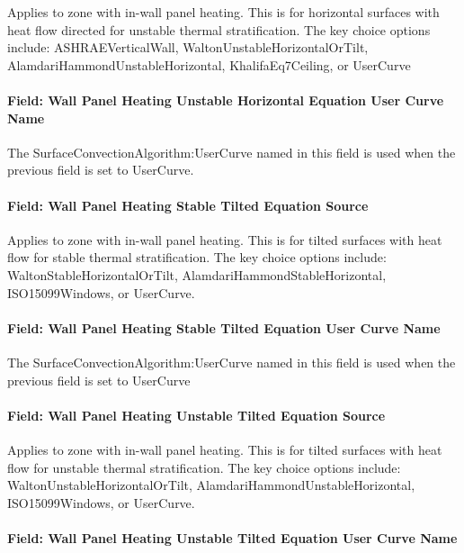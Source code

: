Applies to zone with in-wall panel heating. This is for horizontal surfaces with heat flow directed for unstable thermal stratification. The key choice options include: ASHRAEVerticalWall, WaltonUnstableHorizontalOrTilt, AlamdariHammondUnstableHorizontal, KhalifaEq7Ceiling, or UserCurve

\paragraph{Field: Wall Panel Heating Unstable Horizontal Equation User Curve Name}\label{field-wall-panel-heating-unstable-horizontal-equation-user-curve-name}

The SurfaceConvectionAlgorithm:UserCurve named in this field is used when the previous field is set to UserCurve.

\paragraph{Field: Wall Panel Heating Stable Tilted Equation Source}\label{field-wall-panel-heating-stable-tilted-equation-source}

Applies to zone with in-wall panel heating. This is for tilted surfaces with heat flow for stable thermal stratification. The key choice options include: WaltonStableHorizontalOrTilt, AlamdariHammondStableHorizontal, ISO15099Windows, or UserCurve.

\paragraph{Field: Wall Panel Heating Stable Tilted Equation User Curve Name}\label{field-wall-panel-heating-stable-tilted-equation-user-curve-name}

The SurfaceConvectionAlgorithm:UserCurve named in this field is used when the previous field is set to UserCurve

\paragraph{Field: Wall Panel Heating Unstable Tilted Equation Source}\label{field-wall-panel-heating-unstable-tilted-equation-source}

Applies to zone with in-wall panel heating. This is for tilted surfaces with heat flow for unstable thermal stratification. The key choice options include: WaltonUnstableHorizontalOrTilt, AlamdariHammondUnstableHorizontal, ISO15099Windows, or UserCurve.

\paragraph{Field: Wall Panel Heating Unstable Tilted Equation User Curve Name}\label{field-wall-panel-heating-unstable-tilted-equation-user-curve-name}

